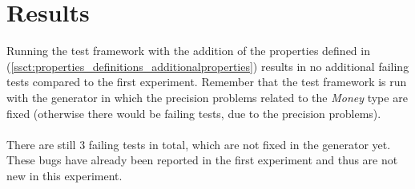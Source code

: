 \section{Results}
Running the test framework with the addition of the properties defined in
(\autoref{ssct:properties_definitions_additionalproperties}) results in no
additional failing tests compared to the first experiment. Remember that the
test framework is run with the generator in which the precision problems related
to the \textit{Money} type are fixed (otherwise there would be failing tests,
due to the precision problems).\\
\\
There are still 3 failing tests in total, which are not fixed in the generator
yet. These bugs have already been reported in the first experiment and thus are
not new in this experiment.

